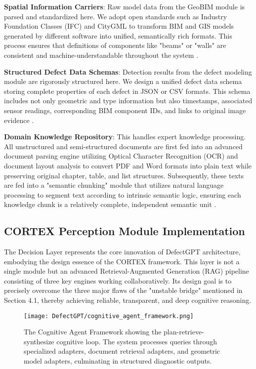 \textbf{Spatial Information Carriers}: Raw model data from the GeoBIM module is parsed and standardized here. We adopt open standards such as Industry Foundation Classes (IFC) and CityGML to transform BIM and GIS models generated by different software into unified, semantically rich formats. This process ensures that definitions of components like "beams" or "walls" are consistent and machine-understandable throughout the system \cite{tang2019retrieving}.

\textbf{Structured Defect Data Schemas}: Detection results from the defect modeling module are rigorously structured here. We design a unified defect data schema storing complete properties of each defect in JSON or CSV formats. This schema includes not only geometric and type information but also timestamps, associated sensor readings, corresponding BIM component IDs, and links to original image evidence \cite{li2024single}.

\textbf{Domain Knowledge Repository}: This handles expert knowledge processing. All unstructured and semi-structured documents are first fed into an advanced document parsing engine utilizing Optical Character Recognition (OCR) and document layout analysis to convert PDF and Word formats into plain text while preserving original chapter, table, and list structures. Subsequently, these texts are fed into a "semantic chunking" module that utilizes natural language processing to segment text according to intrinsic semantic logic, ensuring each knowledge chunk is a relatively complete, independent semantic unit \cite{fan2023retrieval}.

\subsection{CORTEX Perception Module Implementation}

The Decision Layer represents the core innovation of DefectGPT architecture, embodying the design essence of the CORTEX framework. This layer is not a single module but an advanced Retrieval-Augmented Generation (RAG) pipeline consisting of three key engines working collaboratively. Its design goal is to precisely overcome the three major flaws of the "unstable bridge" mentioned in Section 4.1, thereby achieving reliable, transparent, and deep cognitive reasoning.

\begin{figure}[htbp]
\centering
\texttt{[image: DefectGPT/cognitive\_agent\_framework.png]}
\caption{The Cognitive Agent Framework showing the plan-retrieve-synthesize cognitive loop. The system processes queries through specialized adapters, document retrieval adapters, and geometric model adapters, culminating in structured diagnostic outputs.}
\label{fig:cognitive-agent-framework}
\end{figure}

